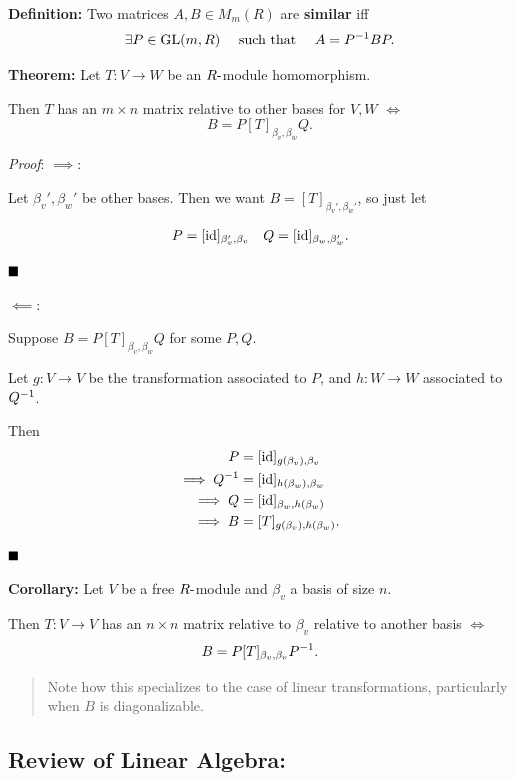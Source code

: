 \textbf{Definition:} Two matrices \(A, B \in M_m(R)\) are
\textbf{similar} iff \begin{align*}
\exists P \in {\text{GL}}(m, R)
\quad \text{ such that } \quad
A = P^{-1} B P
.\end{align*}

\textbf{Theorem:} Let \(T: V\to W\) be an \(R{\hbox{-}}\)module homomorphism.

Then \(T\) has an \(m\times n\) matrix relative to other bases for
\(V, W\) \(\iff\) \[
B = P [T]_{\beta_v, \beta_w} Q
.\]

\emph{Proof}: \(\implies\):

Let \(\beta_v', \beta_w'\) be other bases. Then we want
\(B = [T]_{\beta_v', \beta_w'}\), so just let

\begin{align*}
P = [\text{id}]_{\beta_v', \beta_v} \quad Q = [\text{id}]_{\beta_w, \beta_w'}
.\end{align*}

\(\qed\)

\(\impliedby\):

Suppose \(B = P [T]_{\beta_v, \beta_w} Q\) for some \(P, Q\).

Let \(g: V\to V\) be the transformation associated to \(P\), and
\(h: W \to W\) associated to \(Q^{-1}\).

Then \begin{align*}
P &= [\text{id}]_{g(\beta_v), \beta_v}  \\
\implies Q^{-1} &= [\text{id}]_{h(\beta_w), \beta_w} \\
\implies Q &= [\text{id}]_{\beta_w, h(\beta_w)} \\
\implies B &= [T]_{g(\beta_v), h(\beta_w)}
.\end{align*}

\(\qed\)

\textbf{Corollary:} Let \(V\) be a free \(R{\hbox{-}}\)module and \(\beta_v\)
a basis of size \(n\).

Then \(T: V\to V\) has an \(n\times n\) matrix relative to \(\beta_v\)
relative to another basis \(\iff\) \[
B = P [T]_{\beta_v, \beta_v} P^{-1}
.\]

\begin{quote}
Note how this specializes to the case of linear transformations,
particularly when \(B\) is diagonalizable.
\end{quote}

\hypertarget{review-of-linear-algebra}{%
\subsection{Review of Linear Algebra:}\label{review-of-linear-algebra}}

